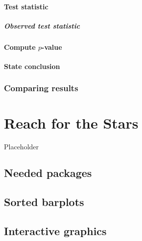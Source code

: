\documentclass[
  12pt, krantz2,
]{krantz}
\begin{document}
\hypertarget{test-statistic-4}{%
\subsubsection*{Test statistic}\label{test-statistic-4}}


\hypertarget{observed-test-statistic-4}{%
\paragraph{Observed test statistic}\label{observed-test-statistic-4}}

\hypertarget{compute-p-value-2}{%
\subsubsection*{\texorpdfstring{Compute \(p\)-value}{Compute p-value}}\label{compute-p-value-2}}


\hypertarget{state-conclusion-4}{%
\subsubsection*{State conclusion}\label{state-conclusion-4}}


\hypertarget{comparing-results-4}{%
\subsection{Comparing results}\label{comparing-results-4}}

\hypertarget{appendixC}{%
\chapter{Reach for the Stars}\label{appendixC}}

Placeholder

\hypertarget{needed-packages-11}{%
\section*{Needed packages}\label{needed-packages-11}}


\hypertarget{sorted-barplots}{%
\section{Sorted barplots}\label{sorted-barplots}}

\hypertarget{interactive-graphics}{%
\section{Interactive graphics}\label{interactive-graphics}}
\end{document}

